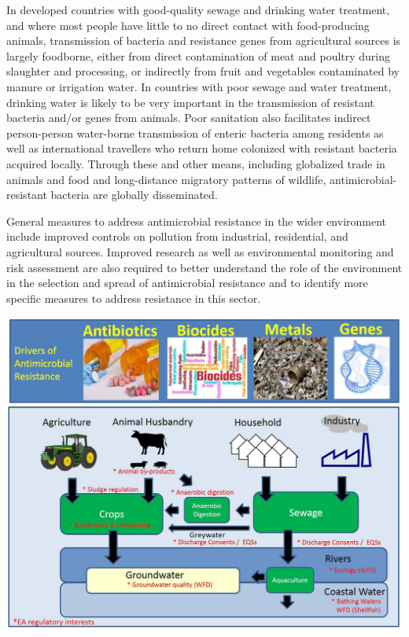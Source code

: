 \documentclass[
]{book}
\begin{document}
In developed countries with good-quality sewage and drinking water treatment, and where most people have little to no direct contact with food-producing animals, transmission of bacteria and resistance genes from agricultural sources is largely foodborne, either from direct contamination of meat and poultry during slaughter and processing, or indirectly from fruit and vegetables contaminated by manure or irrigation water. In countries with poor sewage and water treatment, drinking water is likely to be very important in the transmission of resistant bacteria and/or genes from animals. Poor sanitation also facilitates indirect person-person water-borne transmission of enteric bacteria among residents as well as international travellers who return home colonized with resistant bacteria acquired locally. Through these and other means, including globalized trade in animals and food and long-distance migratory patterns of wildlife, antimicrobial-resistant bacteria are globally disseminated.

General measures to address antimicrobial resistance in the wider environment include improved controls on pollution from industrial, residential, and agricultural sources. Improved research as well as environmental monitoring and risk assessment are also required to better understand the role of the environment in the selection and spread of antimicrobial resistance and to identify more specific measures to address resistance in this sector.

\includegraphics[width=8.33333in,height=\textheight]{images/hotspots.png}
\end{document}
